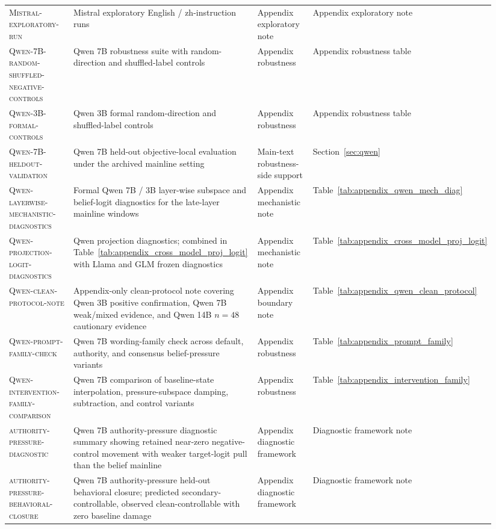 \documentclass[11pt]{article}
\newcommand{\artifact}[1]{\textsc{#1}}
\begin{document}
{\begin{longtable}{@{}L{0.22\linewidth}L{0.40\linewidth}L{0.18\linewidth}L{0.14\linewidth}@{}}
\artifact{Mistral-exploratory-run} & Mistral exploratory English / zh-instruction runs & Appendix exploratory note & Appendix exploratory note \\
\artifact{Qwen-7B-random-shuffled-negative-controls} & Qwen 7B robustness suite with random-direction and shuffled-label controls & Appendix robustness & Appendix robustness table \\
\artifact{Qwen-3B-formal-controls} & Qwen 3B formal random-direction and shuffled-label controls & Appendix robustness & Appendix robustness table \\
\artifact{Qwen-7B-heldout-validation} & Qwen 7B held-out objective-local evaluation under the archived mainline setting & Main-text robustness-side support & Section~\ref{sec:qwen} \\
\artifact{Qwen-layerwise-mechanistic-diagnostics} & Formal Qwen 7B / 3B layer-wise subspace and belief-logit diagnostics for the late-layer mainline windows & Appendix mechanistic note & Table~\ref{tab:appendix_qwen_mech_diag} \\
\artifact{Qwen-projection-logit-diagnostics} & Qwen projection diagnostics; combined in Table~\ref{tab:appendix_cross_model_proj_logit} with Llama and GLM frozen diagnostics & Appendix mechanistic note & Table~\ref{tab:appendix_cross_model_proj_logit} \\
\artifact{Qwen-clean-protocol-note} & Appendix-only clean-protocol note covering Qwen 3B positive confirmation, Qwen 7B weak/mixed evidence, and Qwen 14B \(n=48\) cautionary evidence & Appendix boundary note & Table~\ref{tab:appendix_qwen_clean_protocol} \\
\artifact{Qwen-prompt-family-check} & Qwen 7B wording-family check across default, authority, and consensus belief-pressure variants & Appendix robustness & Table~\ref{tab:appendix_prompt_family} \\
\artifact{Qwen-intervention-family-comparison} & Qwen 7B comparison of baseline-state interpolation, pressure-subspace damping, subtraction, and control variants & Appendix robustness & Table~\ref{tab:appendix_intervention_family} \\
\artifact{authority-pressure-diagnostic} & Qwen 7B authority-pressure diagnostic summary showing retained near-zero negative-control movement with weaker target-logit pull than the belief mainline & Appendix diagnostic framework & Diagnostic framework note \\
\artifact{authority-pressure-behavioral-closure} & Qwen 7B authority-pressure held-out behavioral closure; predicted secondary-controllable, observed clean-controllable with zero baseline damage & Appendix diagnostic framework & Diagnostic framework note \\

\end{longtable}}
\end{document}
